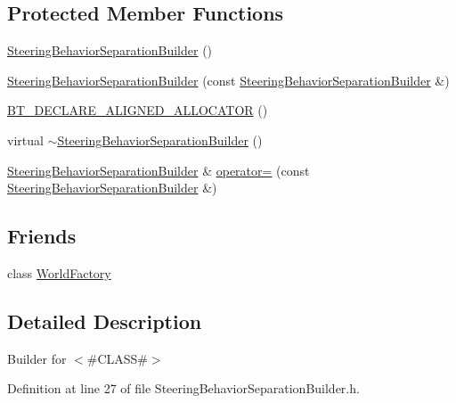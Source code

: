 \subsection*{Protected Member Functions}
\begin{DoxyCompactItemize}
\item 
\mbox{\hyperlink{classnjli_1_1_steering_behavior_separation_builder_a1ff76fa4048a30de2b1ce3bb23ecca19}{Steering\+Behavior\+Separation\+Builder}} ()
\item 
\mbox{\hyperlink{classnjli_1_1_steering_behavior_separation_builder_abf8842b058d78b8ba58f1e4a662063e8}{Steering\+Behavior\+Separation\+Builder}} (const \mbox{\hyperlink{classnjli_1_1_steering_behavior_separation_builder}{Steering\+Behavior\+Separation\+Builder}} \&)
\item 
\mbox{\hyperlink{classnjli_1_1_steering_behavior_separation_builder_aea0ec5f2ae49c4e8746da2f76bdfb384}{B\+T\+\_\+\+D\+E\+C\+L\+A\+R\+E\+\_\+\+A\+L\+I\+G\+N\+E\+D\+\_\+\+A\+L\+L\+O\+C\+A\+T\+OR}} ()
\item 
virtual \mbox{\hyperlink{classnjli_1_1_steering_behavior_separation_builder_a55840eb31dc03f0b206fd18caddfa395}{$\sim$\+Steering\+Behavior\+Separation\+Builder}} ()
\item 
\mbox{\hyperlink{classnjli_1_1_steering_behavior_separation_builder}{Steering\+Behavior\+Separation\+Builder}} \& \mbox{\hyperlink{classnjli_1_1_steering_behavior_separation_builder_a51689c329131ef5119e3c0c0d96a2c4a}{operator=}} (const \mbox{\hyperlink{classnjli_1_1_steering_behavior_separation_builder}{Steering\+Behavior\+Separation\+Builder}} \&)
\end{DoxyCompactItemize}
\subsection*{Friends}
\begin{DoxyCompactItemize}
\item 
class \mbox{\hyperlink{classnjli_1_1_steering_behavior_separation_builder_acb96ebb09abe8f2a37a915a842babfac}{World\+Factory}}
\end{DoxyCompactItemize}


\subsection{Detailed Description}
Builder for $<$\#\+C\+L\+A\+SS\#$>$ 

Definition at line 27 of file Steering\+Behavior\+Separation\+Builder.\+h.



